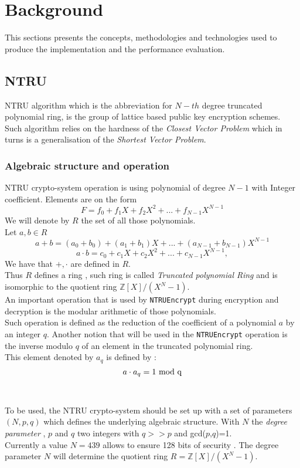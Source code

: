 \section{Background}
\label{sec:background}

This sections presents the concepts, methodologies and technologies used to produce the implementation and the performance evaluation.

\subsection{NTRU}
NTRU algorithm which is the abbreviation for $N-th$ degree truncated polynomial ring, is the group of lattice based public key encryption schemes.\\
Such algorithm relies on the hardness of the \textit{Closest Vector Problem}\cite{micciancio_closest_2003} which in turns is a generalisation of the \textit{Shortest Vector Problem}.
\subsubsection{Algebraic structure and operation}
NTRU crypto-system operation is using polynomial of degree $N-1$ with Integer coefficient. Elements are on the form $$F = f_0+f_1X+f_2X^2+... +f_{N-1}X^{N-1} $$  We will denote by $R$ the set of all those polynomials.\\
Let $a,b \in R$  
$$a+b = (a_0+b_0) + (a_1+b_1)X+...+(a_{N-1}+b_{N-1})X^{N-1}$$
$$ a\cdot b = c_0+c_1X+c_2X^2+...+c_{N-1}X^{N-1}, $$
We have that $+,\cdot $ are defined in $R$. \\Thus $R$ defines a ring , such ring is called \textit{Truncated polynomial Ring} and is isomorphic to the quotient ring $\mathbb{Z}{[X]/(X^N-1)}$.\\
An important operation that is used by \texttt{NTRUEncrypt} during encryption and decryption is the modular arithmetic of those polynomials.\\
Such operation is defined as the reduction of the coefficient of a polynomial $a$ by an integer $q$.
Another notion that will be used in the \texttt{NTRUEncrypt} operation is the inverse modulo $q$ of an element in the truncated polynomial ring.\\ This element denoted by $a_q$ is defined by : $$ a\cdot a_q = 1 \textnormal{ mod q} $$
\\ \\
To be used, the NTRU crypto-system should be set up with a set of parameters $(N,p,q)$ which defines the underlying algebraic structure. With $N$ the \textit{degree parameter} , $p$ and $q$ two integers with $q >> p$ and gcd($p$,$q$)=1.\\ Currently a value $N=439$ allows to ensure 128 bits of security \cite{noauthor_open_2018}. The degree parameter $N$ will determine the quotient ring $R=\mathbb{Z}{[X]/(X^N-1)}$.

